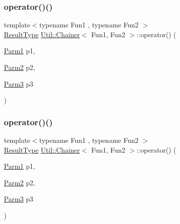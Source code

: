 \subsubsection{\texorpdfstring{operator()()}{operator()()}\hspace{0.1cm}{\footnotesize\ttfamily [10/18]}}
{\footnotesize\ttfamily template$<$typename Fun1 , typename Fun2 $>$ \\
\mbox{\hyperlink{classUtil_1_1Chainer_a2c8d88a77b8ba93eb915dc799ddafbb9}{Result\+Type}} \mbox{\hyperlink{classUtil_1_1Chainer}{Util\+::\+Chainer}}$<$ Fun1, Fun2 $>$\+::operator() (\begin{DoxyParamCaption}\item[{\mbox{\hyperlink{classUtil_1_1Chainer_a3e09b2267dabdd8d12070b09c47749c6}{Parm1}}}]{p1,  }\item[{\mbox{\hyperlink{classUtil_1_1Chainer_a1bfb0e8f35679278c85d232a74a107ff}{Parm2}}}]{p2,  }\item[{\mbox{\hyperlink{classUtil_1_1Chainer_ac28811d7153f7b7cf837f7b8626436c8}{Parm3}}}]{p3 }\end{DoxyParamCaption})\hspace{0.3cm}{\ttfamily [inline]}}

\mbox{\label{classUtil_1_1Chainer_af0f81081283f192626e5a83eb688f573}} 
\subsubsection{\texorpdfstring{operator()()}{operator()()}\hspace{0.1cm}{\footnotesize\ttfamily [11/18]}}
{\footnotesize\ttfamily template$<$typename Fun1 , typename Fun2 $>$ \\
\mbox{\hyperlink{classUtil_1_1Chainer_a2c8d88a77b8ba93eb915dc799ddafbb9}{Result\+Type}} \mbox{\hyperlink{classUtil_1_1Chainer}{Util\+::\+Chainer}}$<$ Fun1, Fun2 $>$\+::operator() (\begin{DoxyParamCaption}\item[{\mbox{\hyperlink{classUtil_1_1Chainer_a3e09b2267dabdd8d12070b09c47749c6}{Parm1}}}]{p1,  }\item[{\mbox{\hyperlink{classUtil_1_1Chainer_a1bfb0e8f35679278c85d232a74a107ff}{Parm2}}}]{p2,  }\item[{\mbox{\hyperlink{classUtil_1_1Chainer_ac28811d7153f7b7cf837f7b8626436c8}{Parm3}}}]{p3 }\end{DoxyParamCaption})\hspace{0.3cm}{\ttfamily [inline]}}


